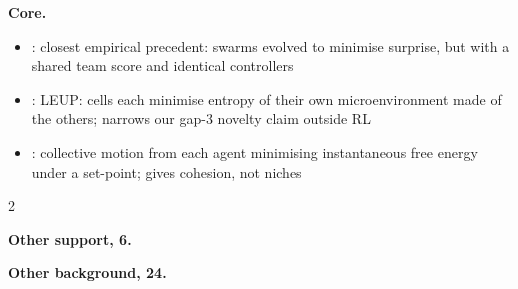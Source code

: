 \documentclass[10pt]{article}
\newcommand{\memb}[1]{\par\smallskip\textbf{#1}\quad}
\begin{document}
\memb{Core.}
\begin{itemize}[nosep,leftmargin=1.2em]
\item \citet{Kaiser-innate22}: closest empirical precedent: swarms evolved to minimise surprise, but with a shared team score and identical controllers
\item \citet{Barua-entropydriven20}: LEUP: cells each minimise entropy of their own microenvironment made of the others; narrows our gap-3 novelty claim outside RL
\item \citet{Heins-collective24}: collective motion from each agent minimising instantaneous free energy under a set-point; gives cohesion, not niches
\end{itemize}
\begin{multicols}{2}
\memb{Other support, 6.} \citetext{\citealp{Hatzikirou-statistical18}\dag; \citealp{Jaques-social19}; \citealp{Hartwig-cooperation21}; \citealp{Kaufmann-active21}; \citealp{Ma-elign22}; \citealp{Maisto-flock25}}

\memb{Other background, 24.} {\footnotesize \citetext{\citealp{Hamann-evolution15}; \citealp{Zahadat-evolving15}\dag; \citealp{Zahadat-evolving15b}; \citealp{Borkowski-evolving17}; \citealp{Kaiser-self19}; \citealp{Kaiser-self19b}; \citealp{Kaiser-diversity20}; \citealp{Kaiser-innate22b}; \citealp{Kaiser-minimize22}; \citealp{Kaiser-evolving23}\dag; \citealp{Barua-least20}; \citealp{Gupta-entropydriven24}; \citealp{Gupta-optimal26}\dag; \citealp{Hughes-inequity18}; \citealp{Khan-toward18}; \citealp{Iqbal-coordinated19}; \citealp{Wang-evolving19}; \citealp{Vasil-world20}; \citealp{Wang-influence20}; \citealp{Albarracin-epistemic22}; \citealp{Nisioti-autotelic22}; \citealp{Toquebiau-joint24}; \citealp{ThestrupWaade-one25}; \citealp{Nomura-social26}}}

\end{multicols}
\end{document}
